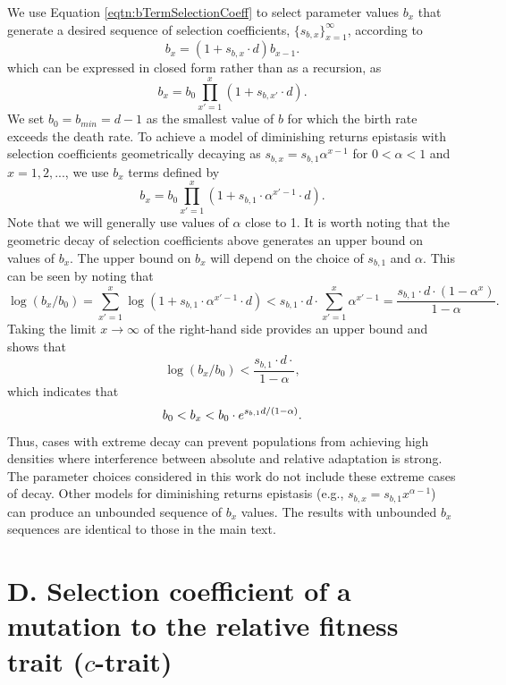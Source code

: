 \documentclass[9pt,twocolumn,twoside,lineno]{gsajnl}
\begin{document}
We use Equation \ref{eqtn:bTermSelectionCoeff} to select parameter values $b_x$ that generate a desired sequence of selection coefficients, $\{ s_{b,x}\}_{x=1}^\infty$, according to
\[
b_{x} = (1+s_{b,x}\cdot d)b_{x-1}.
\]
which can be expressed in closed form rather than as a recursion, as
\begin{equation}
\label{eqtn:bSequenceGivenSelectionCoeff}
b_{x} = b_{0}\prod_{x'=1}^{x} (1+s_{b,x'}\cdot d).
\end{equation}
We set $b_0=b_{min}=d-1$ as the smallest value of $b$ for which the birth rate exceeds the death rate. To achieve a model of diminishing returns epistasis with selection coefficients geometrically decaying as $s_{b,x} = s_{b,1}\alpha^{x-1}$ for $0<\alpha<1$ and $x=1,2,...$, we use $b_x$ terms defined by 
\[
b_{x} = b_{0}\prod_{x'=1}^{x} (1+s_{b,1}\cdot \alpha^{x'-1}\cdot d).    
\]
Note that we will generally use values of $\alpha$ close to 1. It is worth noting that the geometric decay of selection coefficients above generates an upper bound on values of $b_x$. The upper bound on $b_x$ will depend on the choice of $s_{b,1}$ and $\alpha$. This can be seen by noting that   
\[
\log(b_{x}/b_0) =\sum_{x'=1}^{x} \log(1+s_{b,1}\cdot\alpha^{x'-1}\cdot d) < s_{b,1}\cdot d \cdot \sum_{x'=1}^{x} \alpha^{x'-1} = \frac{s_{b,1}\cdot d \cdot (1-\alpha^{x})}{1-\alpha}.
\]
Taking the limit $x\rightarrow\infty$ of the right-hand side provides an upper bound and shows that    
\[
\log(b_{x}/b_0) <  \frac{s_{b,1}\cdot d \cdot}{1-\alpha},
\]
which indicates that 
\[
b_0 < b_{x} < b_0 \cdot e^{s_{b,1}d/(1-\alpha)}.\\
\]
Thus, cases with extreme decay can prevent populations from achieving high densities where interference between absolute and relative adaptation is strong. The parameter choices considered in this work do not include these extreme cases of decay. Other models for diminishing returns epistasis (e.g., $s_{b,x} = s_{b,1}x^{\alpha-1}$) can produce an unbounded sequence of $b_x$ values. The results with unbounded $b_x$ sequences are identical to those in the main text. 

\section{D. Selection coefficient of a mutation to the relative fitness trait ($c$-trait)}
\label{app:sec:SelectionCoefficientRel}
\end{document}
